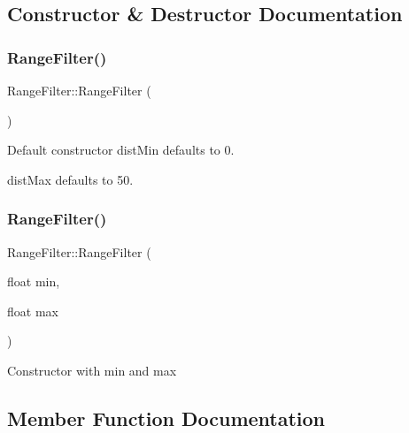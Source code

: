 \subsection{Constructor \& Destructor Documentation}
\mbox{\label{class_range_filter_ad0b28929ddfb283eb0101b00726d1729}} 
\subsubsection{\texorpdfstring{Range\+Filter()}{RangeFilter()}\hspace{0.1cm}{\footnotesize\ttfamily [1/2]}}
{\footnotesize\ttfamily Range\+Filter\+::\+Range\+Filter (\begin{DoxyParamCaption}{ }\end{DoxyParamCaption})\hspace{0.3cm}{\ttfamily [inline]}}

Default constructor dist\+Min defaults to 0.

dist\+Max defaults to 50. \mbox{\label{class_range_filter_afed8c9dea5d2c7857075bfd1f64648a4}} 
\subsubsection{\texorpdfstring{Range\+Filter()}{RangeFilter()}\hspace{0.1cm}{\footnotesize\ttfamily [2/2]}}
{\footnotesize\ttfamily Range\+Filter\+::\+Range\+Filter (\begin{DoxyParamCaption}\item[{float}]{min,  }\item[{float}]{max }\end{DoxyParamCaption})\hspace{0.3cm}{\ttfamily [inline]}}

Constructor with min and max 

\subsection{Member Function Documentation}
\mbox{\label{class_range_filter_a6160f4ffe6788fb7fe935110ad941568}} 
